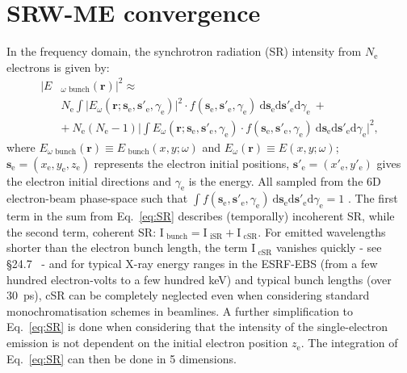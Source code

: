 \documentclass{iucr}              %
\begin{document}
\section{SRW-ME convergence}
\label{appendix:srw}
In the frequency domain, the synchrotron radiation (SR) intensity from $N_\text{e}$ electrons is given by: 
\begin{equation}
\begin{split}
|E&_{\omega\text{~bunch}}(\textbf{r})|^2 \approx \\
 &N_\text{e} \int\big| E_\omega(\textbf{r};\textbf{s}_\text{e}, \textbf{s}'_\text{e}, \gamma_\text{e})\big|^2\cdot f(\textbf{s}_\text{e}, \textbf{s}'_\text{e}, \gamma_\text{e})~ \text{d}\textbf{s}_\text{e} \text{d}\textbf{s}'_\text{e} \text{d}\gamma_\text{e}~+\\
&+~ N_\text{e}(N_\text{e}-1)\bigg| \int E_\omega(\textbf{r};\textbf{s}_\text{e}, \textbf{s}'_\text{e}, \gamma_\text{e})\cdot f(\textbf{s}_\text{e}, \textbf{s}'_\text{e}, \gamma_\text{e})~ \text{d}\textbf{s}_\text{e} \text{d}\textbf{s}'_\text{e} \text{d}\gamma_\text{e} \bigg|^2,
\end{split}
\label{eq:SR}
\end{equation}
where $E_{\omega\text{~bunch}}(\textbf{r})\equiv E_{\text{~bunch}}(x,y;\omega)$ and $E_\omega(\textbf{r})\equiv E(x,y;\omega)$; $\textbf{s}_\text{e}=(x_\text{e},y_\text{e},z_\text{e})$ represents the electron initial positions, $\textbf{s}'_\text{e}=(x'_\text{e},y'_\text{e})$ gives the electron initial directions and $\gamma_\text{e}$ is the energy. All sampled from the 6D electron-beam phase-space such that $\int f(\textbf{s}_\text{e}, \textbf{s}'_\text{e}, \gamma_\text{e})~ \text{d}\textbf{s}_\text{e} \text{d}\textbf{s}'_\text{e} \text{d}\gamma_\text{e}=1$ \cite{codeSRW_CSR}. The first term in the sum from Eq.~\ref{eq:SR} describes (temporally) incoherent SR, while the second term, coherent SR: $\text{I}_\text{~bunch} = \text{I}_\text{~iSR}+\text{I}_\text{~cSR}$. For emitted wavelengths shorter than the electron bunch length, the term $\text{I}_\text{~cSR}$ vanishes quickly - see \S24.7~\cite{Wiedemann2015} - and for typical X-ray energy ranges in the ESRF-EBS (from a few hundred electron-volts to a few hundred keV) and typical bunch lengths (over 30~ps), cSR can be completely neglected even when considering standard monochromatisation schemes in beamlines. A further simplification to Eq.~\ref{eq:SR} is done when considering that the intensity of the single-electron emission is not dependent on the initial electron position $z_\text{e}$. The integration of Eq.~\ref{eq:SR} can then be done in 5 dimensions.
\end{document}
